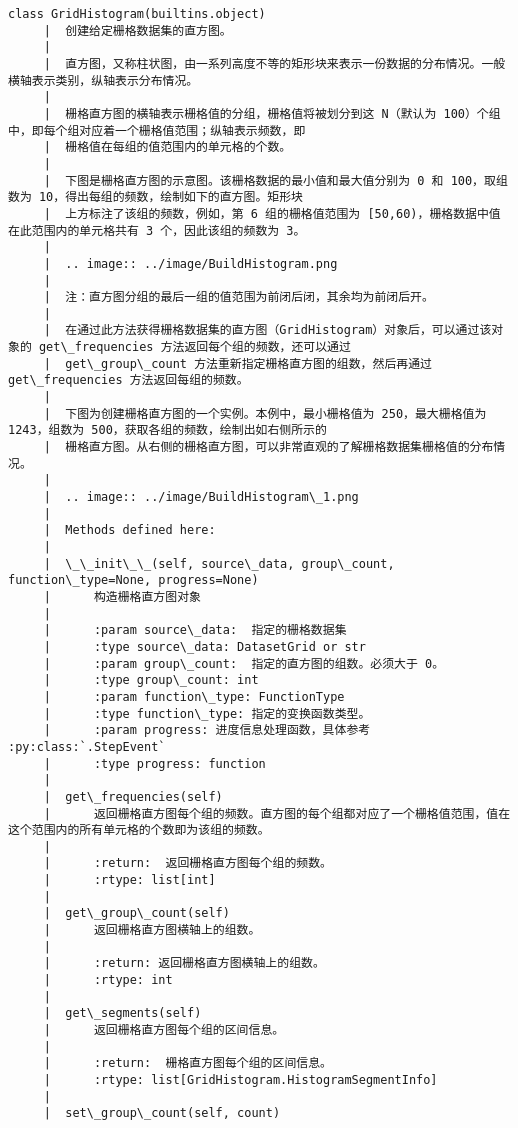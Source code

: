 \documentclass[11pt]{article}
\begin{document}
\begin{Verbatim}[commandchars=\\\{\}]
    class GridHistogram(builtins.object)
     |  创建给定栅格数据集的直方图。
     |  
     |  直方图，又称柱状图，由一系列高度不等的矩形块来表示一份数据的分布情况。一般横轴表示类别，纵轴表示分布情况。
     |  
     |  栅格直方图的横轴表示栅格值的分组，栅格值将被划分到这 N（默认为 100）个组中，即每个组对应着一个栅格值范围；纵轴表示频数，即
     |  栅格值在每组的值范围内的单元格的个数。
     |  
     |  下图是栅格直方图的示意图。该栅格数据的最小值和最大值分别为 0 和 100，取组数为 10，得出每组的频数，绘制如下的直方图。矩形块
     |  上方标注了该组的频数，例如，第 6 组的栅格值范围为 [50,60)，栅格数据中值在此范围内的单元格共有 3 个，因此该组的频数为 3。
     |  
     |  .. image:: ../image/BuildHistogram.png
     |  
     |  注：直方图分组的最后一组的值范围为前闭后闭，其余均为前闭后开。
     |  
     |  在通过此方法获得栅格数据集的直方图（GridHistogram）对象后，可以通过该对象的 get\_frequencies 方法返回每个组的频数，还可以通过
     |  get\_group\_count 方法重新指定栅格直方图的组数，然后再通过 get\_frequencies 方法返回每组的频数。
     |  
     |  下图为创建栅格直方图的一个实例。本例中，最小栅格值为 250，最大栅格值为 1243，组数为 500，获取各组的频数，绘制出如右侧所示的
     |  栅格直方图。从右侧的栅格直方图，可以非常直观的了解栅格数据集栅格值的分布情况。
     |  
     |  .. image:: ../image/BuildHistogram\_1.png
     |  
     |  Methods defined here:
     |  
     |  \_\_init\_\_(self, source\_data, group\_count, function\_type=None, progress=None)
     |      构造栅格直方图对象
     |      
     |      :param source\_data:  指定的栅格数据集
     |      :type source\_data: DatasetGrid or str
     |      :param group\_count:  指定的直方图的组数。必须大于 0。
     |      :type group\_count: int
     |      :param function\_type: FunctionType
     |      :type function\_type: 指定的变换函数类型。
     |      :param progress: 进度信息处理函数，具体参考 :py:class:`.StepEvent`
     |      :type progress: function
     |  
     |  get\_frequencies(self)
     |      返回栅格直方图每个组的频数。直方图的每个组都对应了一个栅格值范围，值在这个范围内的所有单元格的个数即为该组的频数。
     |      
     |      :return:  返回栅格直方图每个组的频数。
     |      :rtype: list[int]
     |  
     |  get\_group\_count(self)
     |      返回栅格直方图横轴上的组数。
     |      
     |      :return: 返回栅格直方图横轴上的组数。
     |      :rtype: int
     |  
     |  get\_segments(self)
     |      返回栅格直方图每个组的区间信息。
     |      
     |      :return:  栅格直方图每个组的区间信息。
     |      :rtype: list[GridHistogram.HistogramSegmentInfo]
     |  
     |  set\_group\_count(self, count)

\end{Verbatim}
\end{document}
